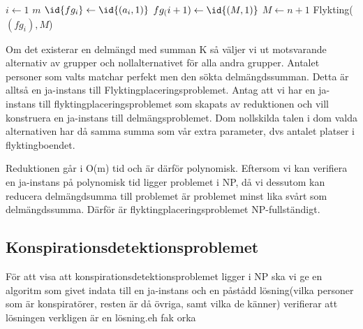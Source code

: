 \documentclass[10pt,a4paper,article,oneside]{memoir}
\begin{document}
\begin{codebox}
\zi \For $i \gets 1$ \To $m$
\zi \Do $\id{fg_i} \gets \id{(a_i,1)}$
\End
\zi $fg_(i+1) \gets \id{(M,1)}$
\zi $M \gets n+1$
\zi \Return Flykting($(fg_i), M$)
\end{codebox}

Om det existerar en delmängd med summan K så väljer vi ut motsvarande alternativ av grupper och nollalternativet för alla andra
grupper. Antalet personer som valts matchar perfekt men den sökta delmängdssumman. Detta är alltså en ja-instans till
Flyktingplaceringsproblemet. Antag att vi har en ja-instans till flyktingplaceringsproblemet som skapats av reduktionen och vill
konstruera en ja-instans till delmängsproblemet. Dom nollskilda talen i dom valda alternativen har då samma summa som vår extra 
parameter, dvs antalet platser i flyktingboendet.

Reduktionen går i O(m) tid och är därför polynomisk. Eftersom vi kan verifiera en ja-instans på polynomisk tid 
ligger problemet i NP, då vi dessutom kan reducera delmängdsumma till problemet är problemet minst lika svårt som delmängdssumma.
Därför är flyktingplaceringsproblemet NP-fullständigt.



\subsection{Konspirationsdetektionsproblemet}

För att visa att konspirationsdetektionsproblemet ligger i NP ska vi ge en algoritm som givet indata till en ja-instans
och en påstådd lösning(vilka personer som är konspiratörer, resten är då övriga, samt vilka de känner) verifierar att
lösningen verkligen är en lösning.eh fak orka
\end{document}
